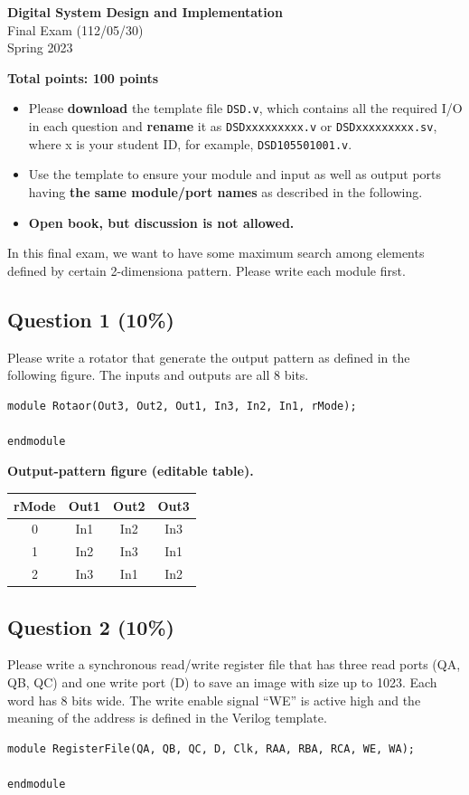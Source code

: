 \documentclass[11pt,a4paper]{article}
\newcommand{\question}[2]{\subsection*{Question #1 \hfill (#2\%)}}
\newcommand{\signal}[1]{\texttt{#1}}
\begin{document}
\begin{center}
{\Large\bfseries Digital System Design and Implementation}\\[5pt]
{\large Final Exam (112/05/30)}\\
Spring 2023
\end{center}
\textbf{Total points: 100 points}
\begin{itemize}
\item Please \textbf{download} the template file \signal{DSD.v}, which
contains all the required I/O in each question and \textbf{rename} it as
\signal{DSDxxxxxxxxx.v} or \signal{DSDxxxxxxxxx.sv}, where x is your
student ID, for example, \signal{DSD105501001.v}.
\item Use the template to ensure your module and input as well as output
ports having \textbf{the same module/port names} as described in the following.
\item \textbf{Open book, but discussion is not allowed.}
\end{itemize}

In this final exam, we want to have some maximum search among elements
defined by certain 2-dimensiona pattern. Please write each module first.

\question{1}{10}
Please write a rotator that generate the output pattern as defined in the
following figure. The inputs and outputs are all 8 bits.
\begin{verbatim}
module Rotaor(Out3, Out2, Out1, In3, In2, In1, rMode);

endmodule
\end{verbatim}
\textbf{Output-pattern figure (editable table).}
\begin{center}
\begin{tabular}{c|ccc}\toprule
rMode & Out1 & Out2 & Out3\\\midrule
0 & In1 & In2 & In3\\
1 & In2 & In3 & In1\\
2 & In3 & In1 & In2\\\bottomrule
\end{tabular}
\end{center}

\question{2}{10}
Please write a synchronous read/write register file that has three read
ports (QA, QB, QC) and one write port (D) to save an image with size up to
1023. Each word has 8 bits wide. The write enable signal ``WE'' is active
high and the meaning of the address is defined in the Verilog template.
\begin{verbatim}
module RegisterFile(QA, QB, QC, D, Clk, RAA, RBA, RCA, WE, WA);

endmodule
\end{verbatim}
\end{document}

